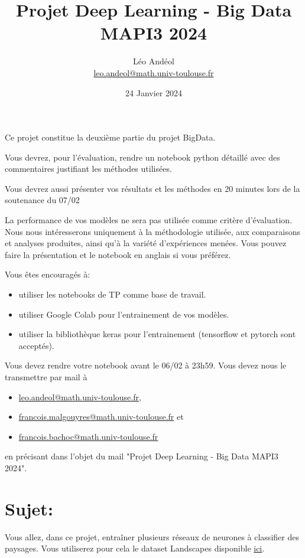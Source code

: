 \documentclass{article}
\title{Projet Deep Learning - Big Data MAPI3 2024}
\author{
    L\'eo And\'eol \\
    \href{mailto:leo.andeol@math.univ-toulouse.fr}{leo.andeol@math.univ-toulouse.fr}
}
\date{24 Janvier 2024}
\begin{document}
\maketitle



Ce projet constitue la deuxième partie du projet BigData.

Vous devrez, pour l'évaluation, rendre un notebook python détaillé avec des commentaires justifiant les méthodes utilisées.

Vous devrez aussi présenter vos résultats et les méthodes en 20 minutes lors de la soutenance du 07/02

La performance de vos modèles ne sera pas utilisée comme critère d'évaluation. Nous nous intéresserons uniquement à la méthodologie utilisée, aux comparaisons et analyses produites, ainsi qu'à la variété d'expériences menées.
Vous pouvez faire la présentation et le notebook en anglais si vous préférez.


Vous êtes encouragés à:
\begin{itemize}
    \item utiliser les notebooks de TP comme base de travail.
    \item utiliser Google Colab pour l'entrainement de vos modèles.
    \item utiliser la bibliothèque keras pour l'entrainement (tensorflow et pytorch sont acceptés).
\end{itemize}

Vous devez rendre votre notebook avant le 06/02 à 23h59.
Vous devez nous le transmettre par mail à
\begin{itemize}
    \item \href{mailto:leo.andeol@math.univ-toulouse.fr}{leo.andeol@math.univ-toulouse.fr},
    \item \href{mailto:francois.malgouyres@math.univ-toulouse.fr}{francois.malgouyres@math.univ-toulouse.fr} et
    \item \href{mailto:francois.bachoc@math.univ-toulouse.fr}{francois.bachoc@math.univ-toulouse.fr}
\end{itemize}
en précisant dans l'objet du mail "Projet Deep Learning - Big Data MAPI3 2024".

\section{Sujet:}
Vous allez, dans ce projet, entraîner plusieurs réseaux de neurones à classifier des paysages. Vous utiliserez pour cela le dataset Landscapes disponible \href{https://github.com/ml5js/ml5-data-and-models/tree/master/datasets/images/landscapes}{ici}.
\end{document}
